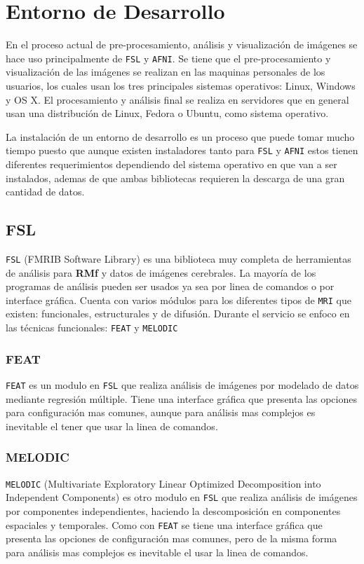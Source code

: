 \documentclass{article}
\begin{document}
\section{Entorno de Desarrollo}

En el proceso actual de pre-procesamiento, análisis y visualización de imágenes se hace uso principalmente de \texttt{FSL} y \texttt{AFNI}. Se tiene que el pre-procesamiento y visualización de las imágenes se realizan en las maquinas personales de los usuarios, los cuales usan los tres principales sistemas operativos: Linux, Windows y OS X. El procesamiento y análisis final se realiza en servidores que en general usan una distribución de Linux, Fedora o Ubuntu, como sistema operativo. 

La instalación de un entorno de desarrollo es un proceso que puede tomar mucho tiempo puesto que aunque existen instaladores tanto para \texttt{FSL} y \texttt{AFNI} estos tienen diferentes requerimientos dependiendo del sistema operativo en que van a ser instalados, ademas de que ambas bibliotecas requieren la descarga de una gran cantidad de datos.

\subsection{FSL}

\texttt{FSL} (FMRIB Software Library) es una biblioteca muy completa de herramientas de análisis para \textbf{RMf} y datos de imágenes cerebrales. La mayoría de los programas de análisis pueden ser usados ya sea por linea de comandos o por interface gráfica. Cuenta con varios módulos para los diferentes tipos de \texttt{MRI} que existen: funcionales, estructurales y de difusión. Durante el servicio se enfoco en las técnicas funcionales: \texttt{FEAT} y \texttt{MELODIC}

\subsubsection{FEAT}
\texttt{FEAT} es un modulo en \texttt{FSL} que realiza análisis de imágenes por modelado de datos mediante regresión múltiple. Tiene una interface gráfica que presenta las opciones para configuración mas comunes, aunque para análisis mas complejos es inevitable el tener que usar la linea de comandos.

\subsubsection{MELODIC}
\texttt{MELODIC} (Multivariate Exploratory Linear Optimized Decomposition into Independent Components) es otro modulo en \texttt{FSL} que realiza análisis de imágenes por componentes independientes, haciendo la descomposición en componentes espaciales y temporales. Como con \texttt{FEAT} se tiene una interface gráfica que presenta las opciones de configuración mas comunes, pero de la misma forma para análisis mas complejos es inevitable el usar la linea de comandos.
\end{document}
